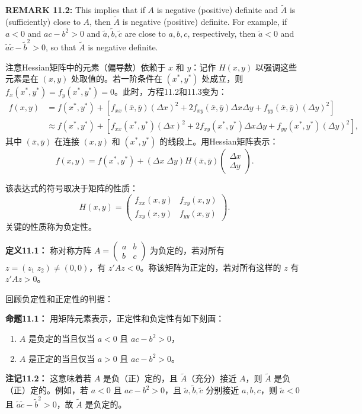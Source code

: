 \begin{original}
\textbf{REMARK 11.2:} This implies that if $A$ is negative (positive) definite and $\tilde{A}$ is (sufficiently) close to $A$, then $\tilde{A}$ is negative (positive) definite. For example, if $a < 0$ and $ac - b^2 > 0$ and $\tilde{a}, \tilde{b}, \tilde{c}$ are close to $a, b, c$, respectively, then $\tilde{a} < 0$ and $\tilde{a}\tilde{c} - \tilde{b}^2 > 0$, so that $\tilde{A}$ is negative definite.
\end{original}
\begin{translation}
注意Hessian矩阵中的元素（偏导数）依赖于 $x$ 和 $y$：记作 $H(x, y)$ 以强调这些元素是在 $(x, y)$ 处取值的。若一阶条件在 $(x^*, y^*)$ 处成立，则 $f_x(x^*, y^*) = f_y(x^*, y^*) = 0$。此时，方程11.2和11.3变为：
\begin{align}
f(x, y) &= f(x^*, y^*) + [f_{xx}(\bar{x}, \bar{y})(\Delta x)^2 + 2f_{xy}(\bar{x}, \bar{y})\Delta x\Delta y + f_{yy}(\bar{x}, \bar{y})(\Delta y)^2] \tag{11.6}\\
&\approx f(x^*, y^*) + [f_{xx}(x^*, y^*)(\Delta x)^2 + 2f_{xy}(x^*, y^*)\Delta x\Delta y + f_{yy}(x^*, y^*)(\Delta y)^2], \tag{11.7}
\end{align}
其中 $(\bar{x}, \bar{y})$ 在连接 $(x, y)$ 和 $(x^*, y^*)$ 的线段上。用Hessian矩阵表示：
\[
f(x, y) = f(x^*, y^*) + (\Delta x\; \Delta y) H(\bar{x}, \bar{y}) \begin{pmatrix} \Delta x \\ \Delta y \end{pmatrix}.
\]

该表达式的符号取决于矩阵的性质：
\[
H(x, y) = \begin{pmatrix} f_{xx}(x, y) & f_{xy}(x, y) \\ f_{xy}(x, y) & f_{yy}(x, y) \end{pmatrix}.
\]
关键的性质称为负定性。

\textbf{定义11.1：} 称对称方阵 $A = \begin{pmatrix} a & b \\ b & c \end{pmatrix}$ 为负定的，若对所有 $z = (z_1\; z_2) \neq (0,0)$，有 $z'Az < 0$。称该矩阵为正定的，若对所有这样的 $z$ 有 $z'Az > 0$。

回顾负定性和正定性的判据：

\textbf{命题11.1：} 用矩阵元素表示，正定性和负定性有如下刻画：
\begin{enumerate}
\item $A$ 是负定的当且仅当 $a < 0$ 且 $ac - b^2 > 0$，
\item $A$ 是正定的当且仅当 $a > 0$ 且 $ac - b^2 > 0$。
\end{enumerate}

\textbf{注记11.2：} 这意味着若 $A$ 是负（正）定的，且 $\tilde{A}$（充分）接近 $A$，则 $\tilde{A}$ 是负（正）定的。例如，若 $a < 0$ 且 $ac - b^2 > 0$，且 $\tilde{a}, \tilde{b}, \tilde{c}$ 分别接近 $a, b, c$，则 $\tilde{a} < 0$ 且 $\tilde{a}\tilde{c} - \tilde{b}^2 > 0$，故 $\tilde{A}$ 是负定的。
\end{translation}

